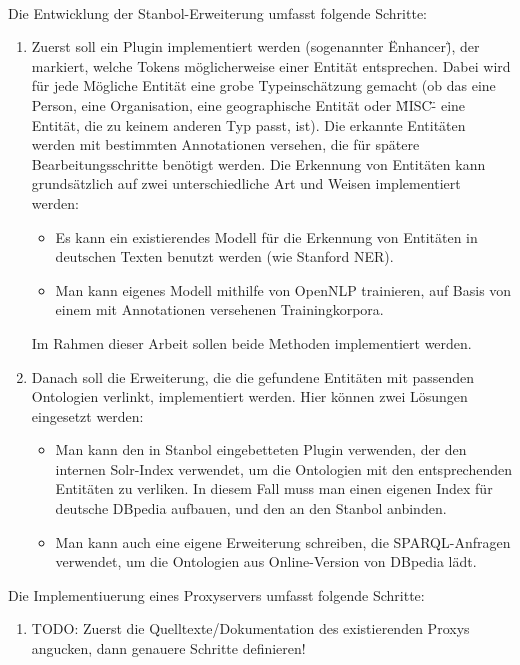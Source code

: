 \paragraph{}
Die Entwicklung der Stanbol-Erweiterung umfasst folgende Schritte:
\begin{enumerate}
\item Zuerst soll ein Plugin implementiert werden (sogenannter \"Enhancer\"), der markiert, welche Tokens möglicherweise einer Entität entsprechen. Dabei wird für jede Mögliche Entität eine grobe Typeinschätzung gemacht (ob das eine Person, eine Organisation, eine geographische Entität oder \"MISC\" - eine Entität, die zu keinem anderen Typ passt, ist). Die erkannte Entitäten werden mit bestimmten Annotationen versehen, die für spätere Bearbeitungsschritte benötigt werden. Die Erkennung von Entitäten kann grundsätzlich auf zwei unterschiedliche Art und Weisen implementiert werden:  
\begin{itemize}
\item Es kann ein existierendes Modell für die Erkennung von Entitäten in deutschen Texten benutzt werden (wie Stanford NER).
\item Man kann eigenes Modell mithilfe von OpenNLP trainieren, auf Basis von einem mit Annotationen versehenen Trainingkorpora.
\end{itemize}
Im Rahmen dieser Arbeit sollen beide Methoden implementiert werden.

\item Danach soll die Erweiterung, die die gefundene Entitäten mit passenden Ontologien verlinkt, implementiert werden. Hier können zwei Lösungen eingesetzt werden:
\begin{itemize}
\item Man kann den in Stanbol eingebetteten Plugin verwenden, der den internen Solr-Index verwendet, um die Ontologien mit den entsprechenden Entitäten zu verliken. In diesem Fall muss man einen eigenen Index für deutsche DBpedia aufbauen, und den an den Stanbol anbinden.
\item Man kann auch eine eigene Erweiterung schreiben, die SPARQL-Anfragen verwendet, um die Ontologien aus Online-Version von DBpedia lädt.
\end{itemize}
\end{enumerate}

Die Implementiuerung eines Proxyservers umfasst folgende Schritte:
\begin{enumerate}
\item TODO: Zuerst die Quelltexte/Dokumentation des existierenden Proxys angucken, dann genauere Schritte definieren!
\end{enumerate}


